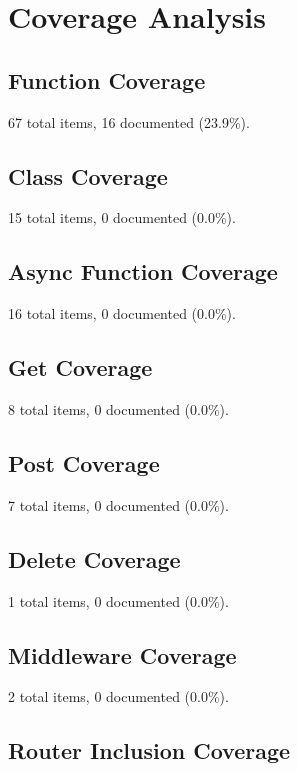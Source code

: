 \documentclass[11pt,a4paper]{article}
\begin{document}
\section{Coverage Analysis}

\subsection{Function Coverage}

67 total items, 16 documented (23.9\%).

\subsection{Class Coverage}

15 total items, 0 documented (0.0\%).

\subsection{Async Function Coverage}

16 total items, 0 documented (0.0\%).

\subsection{Get Coverage}

8 total items, 0 documented (0.0\%).

\subsection{Post Coverage}

7 total items, 0 documented (0.0\%).

\subsection{Delete Coverage}

1 total items, 0 documented (0.0\%).

\subsection{Middleware Coverage}

2 total items, 0 documented (0.0\%).

\subsection{Router Inclusion Coverage}
\end{document}
